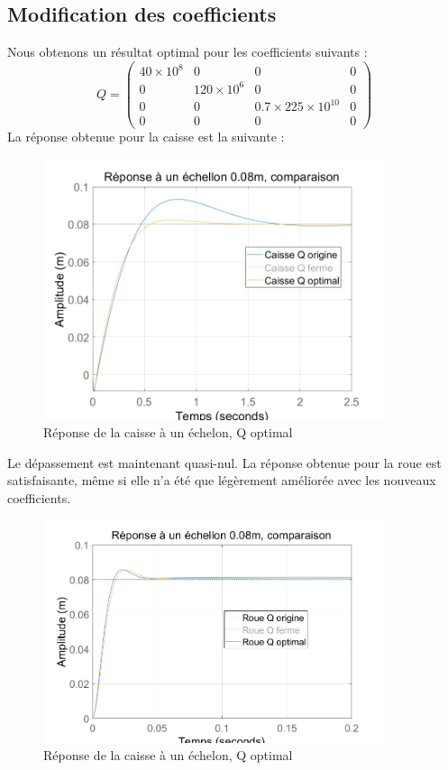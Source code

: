 \documentclass[a4paper,12pt]{insa} %
\begin{document}
\subsection{Modification des coefficients}\label{modcoef}
Nous obtenons un résultat optimal pour les coefficients suivants : 
$$
 Q = 
 \begin{pmatrix}
 40\times10^8 & 0 & 0 & 0 \\ 
 0 & 120\times10^6 & 0 & 0 \\ 
 0 & 0 & 0.7\times225\times10^{10} & 0 \\ 
 0 & 0 & 0 & 0
 \end{pmatrix}
$$
La réponse obtenue pour la caisse est la suivante : 
\begin{center}
    \begin{figure}[H]
        \centering
        \includegraphics[width=10cm, keepaspectratio]{figures/final_LQR_caisse.png}
        \caption{Réponse de la caisse à un échelon, Q optimal}
    \end{figure}
\end{center}
Le dépassement est maintenant quasi-nul.
La réponse obtenue pour la roue est satisfaisante, même si elle n'a été que légèrement améliorée avec les nouveaux coefficients.\\
\begin{center}
    \begin{figure}[H]
        \centering
        \includegraphics[width=10cm, keepaspectratio]{figures/final_LQR_Roue.png}
        \caption{Réponse de la caisse à un échelon, Q optimal}
    \end{figure}
\end{center}
\end{document}
